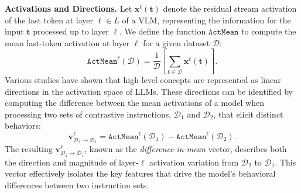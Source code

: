 \textbf{Activations and Directions.}
Let $\mathbf{x}^\ell (\mathbf{t})$ denote the residual stream activation of the last token at layer $\ell \in L$ of a VLM, representing the information for the input $\mathbf{t}$ processed up to layer $\ell$. We define the function $\mathtt{ActMean}$ to compute the mean last-token activation at layer $\ell$ for a given dataset $\mathcal{D}$:
\begin{equation}
\mathtt{ActMean}^\ell (\mathcal{D}) = \frac{1}{\mathcal{D}} \left [ \sum_{\mathbf{t} \in \mathcal{D}} \mathbf{x}^\ell (\mathbf{t}) \right ].
\end{equation}
Various studies \cite{cao2024personalized, arditi2024refusal, park2024linear, marks2023geometry} have shown that high-level concepts are represented as linear directions in the activation space of LLMs. These directions can be identified by computing the difference between the mean activations of a model when processing two sets of contrastive instructions, $\mathcal{D}_1$ and $\mathcal{D}_2$, that elicit distinct behaviors: 
\begin{equation}
\label{eq:r}
    \mathbf{v}^\ell_{\mathcal{D}_2\rightarrow \mathcal{D}_1} = \mathtt{ActMean}^\ell (\mathcal{D}_1) - \mathtt{ActMean}^\ell (\mathcal{D}_2).
\end{equation}
The resulting $\mathbf{v}^\ell_{\mathcal{D}_2\rightarrow \mathcal{D}_1}$, known as the \emph{difference-in-mean} vector, describes both the direction and magnitude of layer-$\ell$ activation variation from $\mathcal{D}_2$ to $\mathcal{D}_1$. This vector effectively isolates the key features that drive the model's behavioral differences between two instruction sets.
